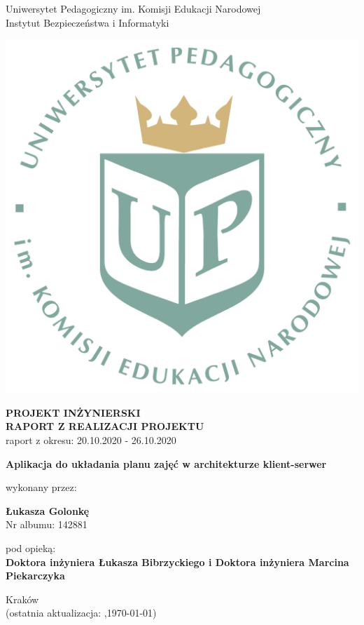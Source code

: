 \documentclass[12pt,a4paper,oneside]{article}
\theoremstyle{definition}
\numberwithin{equation}{section}
\begin{document}

\thispagestyle{empty}
\begin{titlepage}
\begin{center}\Large
Uniwersytet Pedagogiczny im. Komisji Edukacji Narodowej \\
\large
Instytut Bezpieczeństwa i Informatyki\\
\vskip 10pt
\end{center}
\begin{center}
\centering \includegraphics[width=0.4\columnwidth]{../resources/images/logoUP_pl.pdf}
\end{center}

\begin{center}
 {\bf \fontsize{14pt}{14pt}\selectfont PROJEKT INŻYNIERSKI \\ RAPORT Z REALIZACJI PROJEKTU\\
 }
 {\fontsize{12pt}{12pt} raport z okresu: 20.10.2020 - 26.10.2020}
\end{center}
\vskip 5pt
\begin{center}
 {\bf \fontsize{22pt}{22pt}\selectfont Aplikacja do układania planu zajęć w architekturze klient-serwer}
\end{center}

\begin{center}
 {\fontsize{12pt}{12pt}\selectfont wykonany przez: }
\end{center}
\begin{center}
 {\bf\fontsize{16pt}{16pt}\selectfont Łukasza Golonkę}\\
 {\fontsize{12pt}{12pt}\selectfont Nr albumu: 142881 \\}
\end{center}
\begin{center}
 {\fontsize{12pt}{12pt}\selectfont pod opieką:}\\
 {\bf\fontsize{12pt}{12pt}\selectfont Doktora inżyniera Łukasza Bibrzyckiego i Doktora inżyniera Marcina Piekarczyka}
\end{center}

\vspace*{\fill}
\begin{center}
\large
Kraków \the\year\\
(ostatnia aktualizacja: \DTMcurrenttime,\;\today)
\end{center}
\end{titlepage}
\setcounter{page}{0} 
\newpage\null\thispagestyle{empty}
\end{document}
